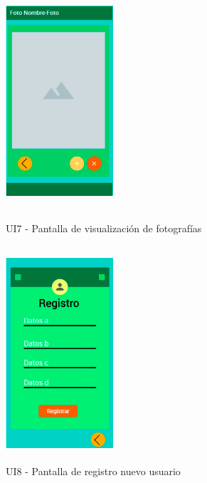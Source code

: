\begin{figure}[h!]
	\begin{minipage}{0.48\textwidth}
		\centering
		\includegraphics[width=4cm,height=8cm]{imagenes/Anexos/Mockup/7-Foto.PNG}
		\caption{UI7 - Pantalla de visualización de fotografías}
		\label{fig:analogo}
	\end{minipage}\hfill
	\begin{minipage}{0.48\textwidth}
		\centering
		\includegraphics[width=4cm,height=8cm]{imagenes/Anexos/Mockup/8-Registro.PNG}
		\caption{UI8 - Pantalla de registro nuevo usuario}
		\label{fig:analogo}
	\end{minipage}\hfill
\end{figure}

